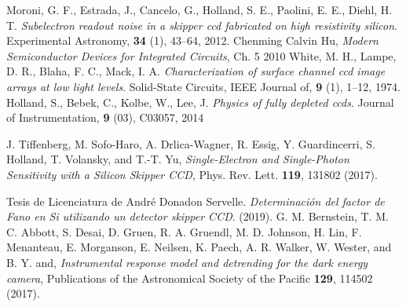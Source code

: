 \documentclass[a4paper,12pt]{report} %
\begin{document}
\begin{thebibliography}{99}
Moroni, G. F., Estrada, J., Cancelo, G., Holland, S. E., Paolini, E. E., Diehl, H. T. \textit{Subelectron readout noise in a skipper ccd fabricated on high resistivity silicon}. Experimental Astronomy, \textbf{34} (1), 43–64, 2012.
Chenming Calvin Hu, \textit{Modern Semiconductor Devices for Integrated Circuits}, Ch. 5 2010
White, M. H., Lampe, D. R., Blaha, F. C., Mack, I. A. \textit{Characterization of surface channel ccd image arrays at low light levels}. Solid-State Circuits, IEEE Journal of, \textbf{9} (1), 1–12, 1974.
Holland, S., Bebek, C., Kolbe, W., Lee, J. \textit{Physics of fully depleted ccds}. Journal of Instrumentation, \textbf{9} (03), C03057, 2014

J. Tiffenberg, M. Sofo-Haro, A. Drlica-Wagner, R. Essig, Y. Guardincerri, S. Holland, T. Volansky, and T.-T. Yu, \textit{Single-Electron and Single-Photon Sensitivity with a Silicon Skipper CCD}, Phys. Rev. Lett. \textbf{119}, 131802 (2017).

Tesis de Licenciatura de André Donadon Servelle. \textit{Determinación del factor de Fano en Si utilizando un detector skipper CCD}. (2019). 
G. M. Bernstein, T. M. C. Abbott, S. Desai, D. Gruen, R. A. Gruendl, M. D. Johnson, H. Lin, F. Menanteau, E. Morganson, E. Neilsen, K. Paech, A. R. Walker, W. Wester, and B. Y. and, \textit{Instrumental response model and detrending for the dark energy camera}, Publications of the Astronomical Society of the Pacific \textbf{129}, 114502 (2017).


\end{thebibliography}
\end{document}
